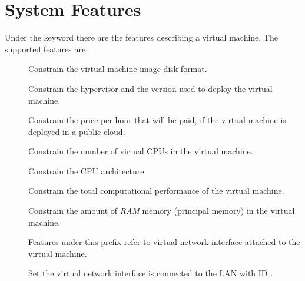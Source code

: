 \documentclass[letterpaper,10pt,english]{sphinxmanual}
\begin{document}
\section{System Features}
\label{radl:system-features}
Under the keyword  there are the features describing a virtual
machine.  The supported features are:
\begin{description}
\item[{}] \leavevmode
Constrain the virtual machine image disk format.

\item[{}] \leavevmode
Constrain the hypervisor and the version used to deploy the virtual machine.

\item[{}] \leavevmode
Constrain the price per hour that will be paid, if the virtual machine is
deployed in a public cloud.

\item[{}] \leavevmode
Constrain the number of virtual CPUs in the virtual machine.

\item[{}] \leavevmode
Constrain the CPU architecture.

\item[{}] \leavevmode
Constrain the total computational performance of the virtual machine.

\item[{}] \leavevmode
Constrain the amount of \emph{RAM} memory (principal memory) in the virtual
machine.

\item[{}] \leavevmode
Features under this prefix refer to virtual network interface attached to
the virtual machine.

\item[{}] \leavevmode
Set the virtual network interface is connected to the LAN with ID
.


\end{description}
\end{document}
